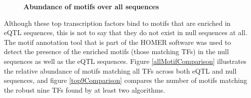 \documentclass[12pt]{article}
\begin{document}
\begin{figure}[!htbp]
\centering
{}
\qquad
{}
\caption{\bf{Abundance of motifs over all sequences}}
\label{heatmap}
\end{figure}

Although these top transcription factors bind to motifs that are enriched in eQTL sequences, this is not to say that they do not exist in null sequences at all. The motif annotation tool that is part of the HOMER software was used to detect the presence of the enriched motifs (those matching TFs) in the null sequences as well as the eQTL sequences. Figure \ref{allMotifComparison} illustrates the relative abundance of motifs matching all TFs across both eQTL and null sequences, and figure \ref{top9Comparison} compares the number of motifs matching the robust nine TFs found by at least two algorithms.
\end{document}
